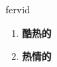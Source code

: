 
\begin{frame}
{\huge fervid}
\begin{center}
\begin{enumerate}\Large
  \item \textbf{酷热的}
  \item \textbf{热情的}
\end{enumerate}
\end{center}
\end{frame}
